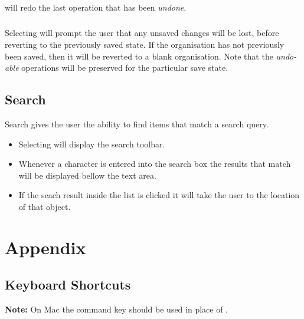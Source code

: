 \documentclass[11pt,fleqn]{book} %
\begin{document}
\paragraph{}
 will redo the last operation that has been \textit{undone}.

\paragraph{}
Selecting  will prompt the user that any unsaved changes will be lost, before reverting
to the previously saved state. If the organisation has not previously been saved, then it will be reverted
to a blank organisation. Note that the \textit{undo-able} operations will be preserved for the particular save state.

\section{Search}
Search gives the user the ability to find items that match a search query.

\begin{itemize}
\item Selecting  will display the search toolbar.
\item Whenever a character is entered into the search box the results that match will be displayed bellow the text area.
\item If the seach result inside the list is clicked it will take the user to the location of that object.
\end{itemize}

\appendix
\chapter{Appendix}
\clearpage

\section{Keyboard Shortcuts}

\textbf{Note:} On Mac the command key \keys{\cmd} should be used
  in place of \keys{\ctrl}.
\end{document}
